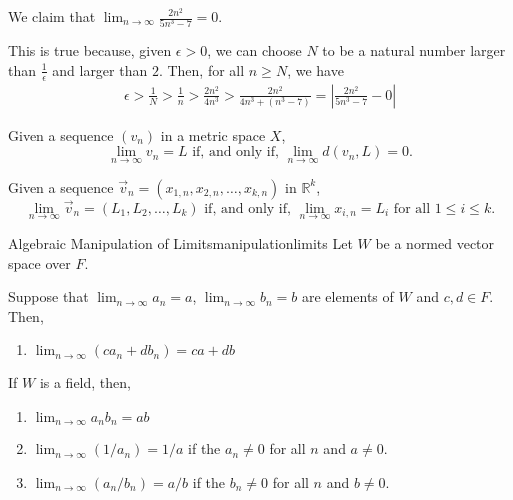 
\begin{exmp}{}{}
	We claim that \(\lim_{n\to\infty} \frac{2n^2}{5n^3 - 7} = 0\).

	This is true because, given  \(\epsilon > 0\), we can choose \(N\) to be a natural number larger than \(\frac{1}{\epsilon}\) and larger than \(2\). Then, for all  \(n \geq N\), we have \begin{align*}
		\epsilon > \frac{1}{N} > \frac{1}{n} > \frac{2n^2}{4n^3} > \frac{2n^2}{4n^3 + (n^3 - 7)} = \left| \frac{2n^2}{5n^3 - 7} - 0 \right|
	\end{align*}
\end{exmp}

\begin{thm}{}{}
	Given a sequence \((v_n)\) in a metric space \(X\), \[
		\lim_{n\to\infty} v_n = L \text{ if, and only if, } \lim_{n\to\infty} d(v_n, L) = 0.
	\]
\end{thm}

\begin{prop}{}{}
	Given a sequence \(\vec v_n = (x_{1, n}, x_{2, n}, \dots, x_{k, n})\) in  \(\mathbb{R}^k\), \[
		\lim_{n\to\infty} \vec v_n = (L_1, L_2, \dots, L_k) \text{ if, and only if, } \lim_{n\to\infty} x_{i, n} = L_i \text{ for all \(1 \leq i \leq k\)}.
	\]
\end{prop}


\begin{thm}{Algebraic Manipulation of Limits}{manipulationlimits}
	Let \(W\) be a normed vector space over \(F\).

	Suppose that \(\lim_{n\to\infty} a_n = a\), \(\lim_{n\to\infty} b_n = b\) are elements of \(W\) and \(c, d \in F\).
	Then, 
	\begin{enumerate}
		\item \(\lim_{n\to\infty} (ca_n + db_n) = ca + db\)
	\end{enumerate}

	If \(W\) is a field, then,
	\begin{enumerate}[resume]
		\item \(\lim_{n\to\infty} a_nb_n = ab\)
		\item \(\lim_{n\to\infty} (1/a_n) = 1/a\) if the \(a_n \neq 0\) for all  \(n\) and \(a \neq 0\).
		\item \(\lim_{n\to\infty} (a_n/b_n) = a/b\) if the \(b_n \neq 0\) for all  \(n\) and \(b \neq 0\).
	\end{enumerate} 
\end{thm}

